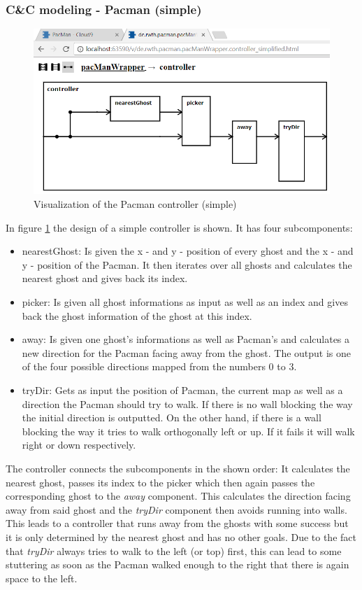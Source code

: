 \subsubsection{C\&C modeling - Pacman (simple)}
\begin{figure}
	\caption{Visualization of the Pacman controller (simple)}
	\label{fig:visPacmanSimple}
	\centering
	\includegraphics[width=\textwidth]{pictures/VisualizationPacmanSimple.png}
\end{figure}
In figure \ref{fig:visPacmanSimple} the design of a simple controller is shown. It has four subcomponents:
\begin{itemize}
	\item nearestGhost: Is given the x - and y - position of every ghost and the x - and y - position of the Pacman. It then iterates over all ghosts and calculates the nearest ghost and gives back its index.
	\item picker: Is given all ghost informations as input as well as an index and gives back the ghost information of the ghost at this index.
	\item away: Is given one ghost's informations as well as Pacman's and calculates a new direction for the Pacman facing away from the ghost. The output is one of the four possible directions mapped from the numbers 0 to 3.
	\item tryDir: Gets as input the position of Pacman, the current map as well as a direction the Pacman should try to walk. If there is no wall blocking the way the initial direction is outputted. On the other hand, if there is a wall blocking the way it tries to walk orthogonally left or up. If it fails it will walk right or down respectively.
\end{itemize}
The controller connects the subcomponents in the shown order: It calculates the nearest ghost, passes its index to the picker which then again passes the corresponding ghost to the \textit{away} component. This calculates the direction facing away from said ghost and the \textit{tryDir} component then avoids running into walls. This leads to a controller that runs away from the ghosts with some success but it is only determined by the nearest ghost and has no other goals. Due to the fact that \textit{tryDir} always tries to walk to the left (or top) first, this can lead to some stuttering as soon as the Pacman walked enough to the right that there is again space to the left. \newline
